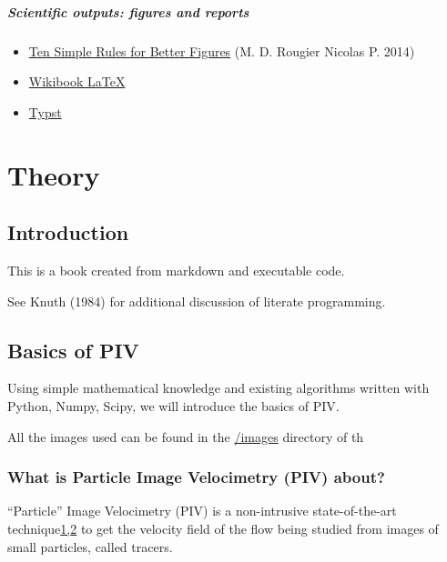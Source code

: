 \documentclass[
  english,
  letterpaper,
  numbers=noendperiod,
  DIV=13]{scrreprt}
\providecommand{\tightlist}{%
  \setlength{\itemsep}{0pt}\setlength{\parskip}{0pt}}
\begin{document}
\subsubsection*{Scientific outputs: figures and
reports}\label{scientific-outputs-figures-and-reports}

\begin{itemize}
\tightlist
\item
  \href{https://journals.plos.org/ploscompbiol/article/file?id=10.1371/journal.pcbi.1003833&type=printable}{Ten
  Simple Rules for Better Figures} (M. D. Rougier Nicolas P. 2014)
\item
  \href{https://fr.wikibooks.org/wiki/LaTeX}{Wikibook LaTeX}
\item
  \href{https://typst.app/}{Typst}
\end{itemize}

\part{Theory}

\chapter{Introduction}\label{introduction}

This is a book created from markdown and executable code.

See Knuth (1984) for additional discussion of literate programming.

\chapter{Basics of PIV}\label{basics-of-piv}

Using simple mathematical knowledge and existing algorithms written with
Python, Numpy, Scipy, we will introduce the basics of PIV.

All the images used can be found in the
\href{https://github.com/jfkrawczynski/um5mee12_jfk/tree/main/images}{/images}
directory of th

\section{What is Particle Image Velocimetry (PIV)
about?}\label{what-is-particle-image-velocimetry-piv-about}

``Particle'' Image Velocimetry (PIV) is a non-intrusive state-of-the-art
technique\hyperref[fn1]{1,}\hyperref[fn2]{2} to get the velocity field
of the flow being studied from images of small particles, called
tracers.
\end{document}
